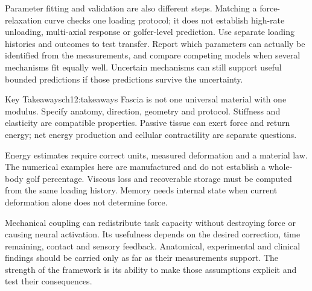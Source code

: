Parameter fitting and validation are also different steps. Matching a force-relaxation curve checks one loading protocol; it does not establish high-rate unloading, multi-axial response or golfer-level prediction. Use separate loading histories and outcomes to test transfer. Report which parameters can actually be identified from the measurements, and compare competing models when several mechanisms fit equally well. Uncertain mechanisms can still support useful bounded predictions if those predictions survive the uncertainty.

\begin{principle}{Key Takeaways}{ch12:takeaways}
Fascia is not one universal material with one modulus. Specify anatomy, direction, geometry and protocol. Stiffness and elasticity are compatible properties. Passive tissue can exert force and return energy; net energy production and cellular contractility are separate questions.

Energy estimates require correct units, measured deformation and a material law. The numerical examples here are manufactured and do not establish a whole-body golf percentage. Viscous loss and recoverable storage must be computed from the same loading history. Memory needs internal state when current deformation alone does not determine force.

Mechanical coupling can redistribute task capacity without destroying force or causing neural activation. Its usefulness depends on the desired correction, time remaining, contact and sensory feedback. Anatomical, experimental and clinical findings should be carried only as far as their measurements support. The strength of the framework is its ability to make those assumptions explicit and test their consequences.
\end{principle}


